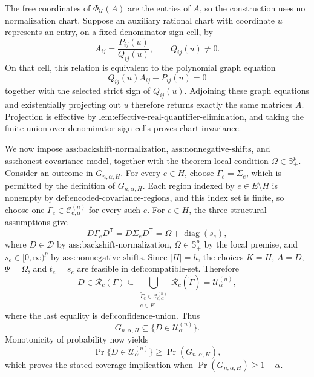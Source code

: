 The free coordinates of \(\Phi_{\mathcal U}(A)\) are the entries of \(A\), so the construction uses no normalization chart. Suppose an auxiliary rational chart with coordinate \(u\) represents an entry, on a fixed denominator-sign cell, by
\[
A_{ij}=\frac{P_{ij}(u)}{Q_{ij}(u)},
\qquad Q_{ij}(u)\neq0.
\]
On that cell, this relation is equivalent to the polynomial graph equation
\[
Q_{ij}(u)A_{ij}-P_{ij}(u)=0
\]
together with the selected strict sign of \(Q_{ij}(u)\). Adjoining these graph equations and existentially projecting out \(u\) therefore returns exactly the same matrices \(A\). Projection is effective by \(\text{lem:effective-real-quantifier-elimination}\), and taking the finite union over denominator-sign cells proves chart invariance.

We now impose \(\text{ass:backshift-normalization}\), \(\text{ass:nonnegative-shifts}\), and \(\text{ass:honest-covariance-model}\), together with the theorem-local condition \(\Omega\in\mathbb S_+^p\). Consider an outcome in \(G_{n,\alpha,H}\). For every \(e\in H\), choose \(\Gamma_e=\Sigma_e\), which is permitted by the definition of \(G_{n,\alpha,H}\). Each region indexed by \(e\in E\setminus H\) is nonempty by \(\text{def:encoded-covariance-regions}\), and this index set is finite, so choose one \(\Gamma_e\in\mathcal C^{(n)}_{e,\alpha}\) for every such \(e\). For \(e\in H\), the three structural assumptions give
\[
D\Gamma_eD^{\mathsf T}
=D\Sigma_eD^{\mathsf T}
=\Omega+\operatorname{diag}(s_e),
\]
where \(D\in\mathcal D\) by \(\text{ass:backshift-normalization}\), \(\Omega\in\mathbb S_+^p\) by the local premise, and \(s_e\in[0,\infty)^p\) by \(\text{ass:nonnegative-shifts}\). Since \(|H|=h\), the choices \(K=H\), \(A=D\), \(\Psi=\Omega\), and \(t_e=s_e\) are feasible in \(\text{def:compatible-set}\). Therefore
\[
D\in\mathcal R_c(\Gamma)
\subseteq
\bigcup_{\substack{\widetilde\Gamma_e\in\mathcal C^{(n)}_{e,\alpha}\\e\in E}}
\mathcal R_c(\widetilde\Gamma)
=\mathcal U^{(n)}_\alpha,
\]
where the last equality is \(\text{def:confidence-union}\). Thus
\[
G_{n,\alpha,H}\subseteq\{D\in\mathcal U^{(n)}_\alpha\}.
\]
Monotonicity of probability now yields
\[
\Pr\{D\in\mathcal U^{(n)}_\alpha\}
\geq\Pr(G_{n,\alpha,H}),
\]
which proves the stated coverage implication when \(\Pr(G_{n,\alpha,H})\geq1-\alpha\).

